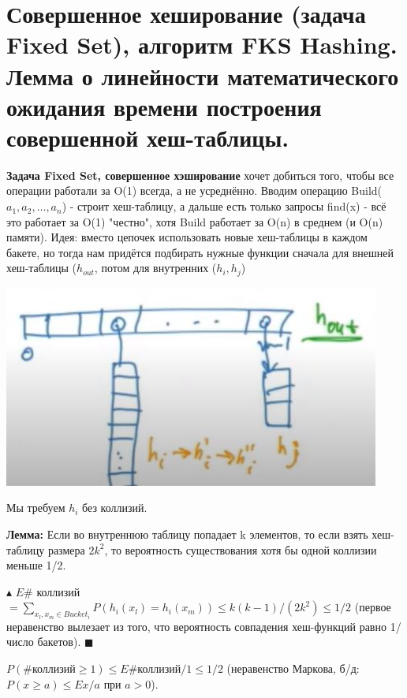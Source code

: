 \section{Совершенное хеширование (задача Fixed Set), алгоритм FKS Hashing. Лемма о линейности математического ожидания времени построения совершенной хеш-таблицы.}
\textbf{Задача Fixed Set, совершенное хэширование} хочет добиться того, чтобы все операции работали за O(1) всегда, а не усреднённо. Вводим операцию Build($a_1, a_2, \dots, a_n$) - строит хеш-таблицу, а дальше есть только запросы find(x) - всё это работает за O(1) "честно", хотя Build работает за O(n) в среднем (и O(n) памяти). Идея: вместо цепочек использовать новые хеш-таблицы в каждом бакете, но тогда нам придётся подбирать нужные функции сначала для внешней хеш-таблицы ($h_{out}$, потом для внутренних ($h_i, h_j$) \par
\includegraphics{images/76-83_perfect hash} \par
Мы требуем $h_i$ без коллизий. \par
\textbf{Лемма:} Если во внутреннюю таблицу попадает k элементов, то если взять хеш-таблицу размера $2k^2$, то вероятность существования хотя бы одной коллизии меньше 1/2. \par
$\blacktriangle$
$E \#$ коллизий $ = \sum_{x_l, x_m \in Bucket_i} P(h_i(x_l) = h_i(x_m)) \leqslant k(k-1)/(2k^2) \leqslant 1/2$ (первое неравенство вылезает из того, что вероятность совпадения хеш-функций равно 1/число бакетов).
$\blacksquare$ \par
$P(\# \text{коллизий} \geqslant 1) \leqslant E \#\text{коллизий} / 1 \leqslant 1/2$ (неравенство Маркова, б/д: $P(x \geqslant a) \leqslant E x / a$ при $a > 0$).

